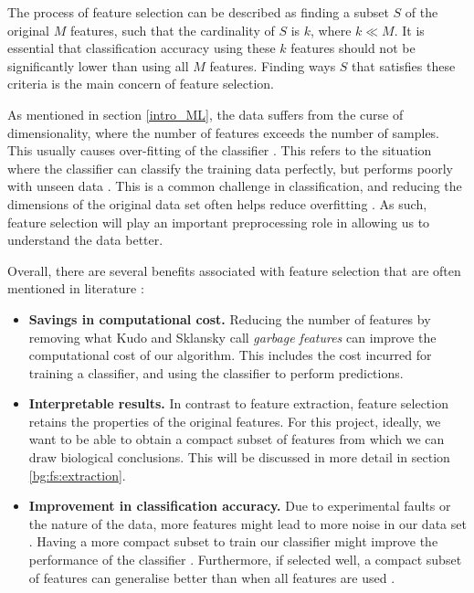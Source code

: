\documentclass[12pt, twoside, a4paper]{report}
\begin{document}
The process of feature selection can be described as finding a subset $S$ of the original $M$ features, such that the cardinality of $S$ is $k$, where $k \ll M$. It is essential that classification accuracy using these $k$ features should not be significantly lower than using all $M$ features. Finding ways $S$ that satisfies these criteria is the main concern of feature selection.

As mentioned in section \ref{intro_ML}, the data suffers from the curse of dimensionality, where the number of features exceeds the number of samples. This usually causes over-fitting of the classifier \cite{RefWorks:115, RefWorks:175}. This refers to the situation where the classifier can classify the training data perfectly, but performs poorly with unseen data \cite{RefWorks:98}. This is a common challenge in classification, and reducing the dimensions of the original data set often helps reduce overfitting \cite{RefWorks:228}. As such, feature selection will play an important preprocessing role in allowing us to understand the data better.

Overall, there are several benefits associated with feature selection that are often mentioned in literature \cite{RefWorks:140}:
\begin{itemize}
  \item \textbf{Savings in computational cost.} Reducing the number of features by removing what Kudo and Sklansky call \textit{garbage features} \cite{RefWorks:210} can improve the computational cost of our algorithm. This includes the cost incurred for training a classifier, and using the classifier to perform predictions.
  \item \textbf{Interpretable results.} In contrast to feature extraction, feature selection retains the properties of the original features. For this project, ideally, we want to be able to obtain a compact subset of features from which we can draw biological conclusions. This will be discussed in more detail in section \ref{bg:fs:extraction}.
  \item \textbf{Improvement in classification accuracy.} Due to experimental faults or the nature of the data, more features might lead to more noise in our data set \cite{RefWorks:163, RefWorks:197}. Having a more compact subset to train our classifier might improve the performance of the classifier \cite{RefWorks:174}. Furthermore, if selected well, a compact subset of features can generalise better than when all features are used \cite{RefWorks:233}.
\end{itemize}
\end{document}
